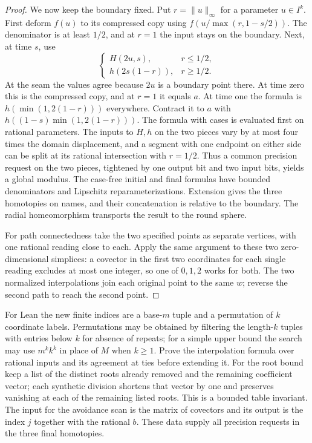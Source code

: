 \begin{proof}
We now keep the boundary fixed. Put $r=\|u\|_\infty$ for a parameter
$u\in I^k$. First deform $f(u)$ to its compressed copy using
$f(u/\max(r,1-s/2))$. The denominator is at least $1/2$, and at $r=1$
the input stays on the boundary. Next, at time $s$, use
\[
 \begin{cases}
  H(2u,s),&r\le1/2,\\
  h(2s(1-r)),&r\ge1/2.
 \end{cases}
\]
At the seam the values agree because $2u$ is a boundary point there.
At time zero this is the compressed copy, and at $r=1$ it equals $a$.
At time one the formula is $h(\min(1,2(1-r)))$ everywhere. Contract
it to $a$ with $h((1-s)\min(1,2(1-r)))$. The formula with cases is
evaluated first on rational parameters. The inputs to $H,h$ on the two
pieces vary by at most four times the domain displacement, and a segment
with one endpoint on either side can be split at its rational intersection
with $r=1/2$. Thus a common precision request on the two pieces, tightened
by one output bit and two input bits, yields a global modulus. The
case-free initial and final formulas have bounded denominators and
Lipschitz reparameterizations. Extension gives the three homotopies on
names, and their concatenation is relative to the boundary. The radial
homeomorphism transports the result to the round sphere.

For path connectedness take the two specified points as separate vertices,
with one rational reading close to each. Apply the same argument to these
two zero-dimensional simplices: a covector in the first two coordinates
for each single reading excludes at most one integer, so one of $0,1,2$
works for both. The two normalized interpolations join each original
point to the same $w$; reverse the second path to reach the second point.
\end{proof}

For Lean the new finite indices are a base-$m$ tuple and a permutation of
$k$ coordinate labels. Permutations may be obtained by filtering the
length-$k$ tuples with entries below $k$ for absence of repeats; for a simple
upper bound the search may use $m^k k^k$ in place of $M$ when $k\ge1$.
Prove the interpolation formula over rational inputs and its agreement
at ties before extending it. For the root bound keep a list of the distinct
roots already removed and the remaining coefficient vector; each synthetic
division shortens that vector by one and preserves vanishing at each of the
remaining listed roots. This is a bounded table invariant. The input for
the avoidance scan is the matrix of covectors and its output is the index
$j$ together with the rational $b$. These data supply all precision
requests in the three final homotopies.

